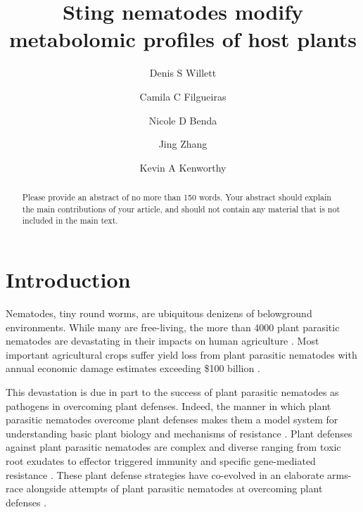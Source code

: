 \documentclass[9pt,lineno]{elife}
\title{Sting nematodes modify metabolomic profiles of host plants}
\author[1*,\authfn{1}]{Denis S Willett}
\author[1,\authfn{1}]{Camila C Filgueiras}
\author[2]{Nicole D Benda}
\author[2]{Jing Zhang}
\author[3]{Kevin A Kenworthy}
\affil[1]{Applied Chemical Ecology Technology, Department of Entomology, Cornell AgriTech}
\affil[2]{Entomology and Nemotalogy Department, University of Florida}
\affil[3]{Agronomy Department, University of Florida}
\begin{document}
\maketitle

\begin{abstract}
Please provide an abstract of no more than 150 words. Your abstract should explain the main contributions of your article, and should not contain any material that is not included in the main text.
\end{abstract}


\section{Introduction}

Nematodes, tiny round worms, are ubiquitous denizens of belowground environments.  While many are free-living, the more than 4000 plant parasitic nematodes are devastating in their impacts on human agriculture \citep{jones2013top,moens}. Most important agricultural crops suffer yield loss from plant parasitic nematodes with annual economic damage estimates exceeding \$100 billion \citep{jones2013top, williamson2006nematode}.  

This devastation is due in part to the success of plant parasitic nematodes as pathogens in overcoming plant defenses.  Indeed, the manner in which plant parasitic nematodes overcome plant defenses makes them a model system for understanding basic plant biology and mechanisms of resistance \citep{opperman1998soybean,williamson2006nematode}.  Plant defenses against plant parasitic nematodes are complex and diverse ranging from toxic root exudates to effector triggered immunity and specific gene-mediated resistance \citep{yeates1987plants, williamson2006nematode}.  These plant defense strategies have co-evolved in an elaborate arms-race alongside attempts of plant parasitic nematodes at overcoming plant defenses \citep{stone1985co,williamson2006nematode,zacheo1995plant}.  
\end{document}
